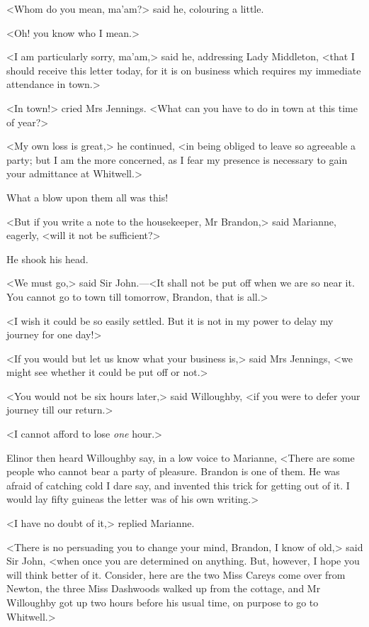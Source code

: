 <Whom do you mean, ma'am?> said he, colouring a little.

<Oh! you know who I mean.>

<I am particularly sorry, ma'am,> said he, addressing Lady Middleton, <that I should receive this letter today, for it is on business which requires my immediate attendance in town.>

<In town!> cried Mrs Jennings. <What can you have to do in town at this time of year?>

<My own loss is great,> he continued, <in being obliged to leave so agreeable a party; but I am the more concerned, as I fear my presence is necessary to gain your admittance at Whitwell.>

What a blow upon them all was this!

<But if you write a note to the housekeeper, Mr Brandon,> said Marianne, eagerly, <will it not be sufficient?>

He shook his head.

<We must go,> said Sir John.—<It shall not be put off when we are so near it. You cannot go to town till tomorrow, Brandon, that is all.>

<I wish it could be so easily settled. But it is not in my power to delay my journey for one day!>

<If you would but let us know what your business is,> said Mrs Jennings, <we might see whether it could be put off or not.>

<You would not be six hours later,> said Willoughby, <if you were to defer your journey till our return.>

<I cannot afford to lose \textit{one} hour.>

Elinor then heard Willoughby say, in a low voice to Marianne, <There are some people who cannot bear a party of pleasure. Brandon is one of them. He was afraid of catching cold I dare say, and invented this trick for getting out of it. I would lay fifty guineas the letter was of his own writing.>

<I have no doubt of it,> replied Marianne.

<There is no persuading you to change your mind, Brandon, I know of old,> said Sir John, <when once you are determined on anything. But, however, I hope you will think better of it. Consider, here are the two Miss Careys come over from Newton, the three Miss Dashwoods walked up from the cottage, and Mr Willoughby got up two hours before his usual time, on purpose to go to Whitwell.>

